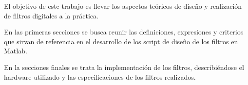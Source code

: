\documentclass[informe.tex]{subfiles}
\begin{document}

\justify
El objetivo de este trabajo es llevar los aspectos teóricos de diseño y realización de filtros digitales a la práctica.\newline

En las primeras secciones se busca reunir las definiciones, expresiones y criterios que sirvan de referencia en el desarrollo de los script de diseño de los filtros en Matlab.\newline

En la secciones finales se trata la implementación de los filtros, describiéndose el hardware utilizado y las especificaciones de los filtros realizados.
\end{document}
